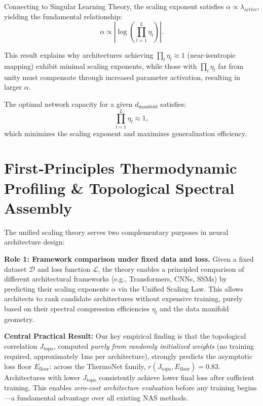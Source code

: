 \documentclass[11pt, a4paper]{article}
\theoremstyle{definition}
\begin{document}
Connecting to Singular Learning Theory, the scaling exponent satisfies $\alpha \propto \lambda_{\text{active}}$, yielding the fundamental relationship:
\begin{equation}
\alpha \propto \left| \log\left(\prod_{l=1}^{L} \eta_l\right) \right|.
\label{eq:alpha_log_eta}
\end{equation}

This result explains why architectures achieving $\prod_l \eta_l \approx 1$ (near-isentropic mapping) exhibit minimal scaling exponents, while those with $\prod_l \eta_l$ far from unity must compensate through increased parameter activation, resulting in larger $\alpha$.

\begin{coro}
The optimal network capacity for a given $d_{\text{manifold}}$ satisfies:
\begin{equation}
\prod_{l=1}^{L}\eta_l \approx 1,
\end{equation}
which minimizes the scaling exponent and maximizes generalization efficiency.
\end{coro}

\section{First‑Principles Thermodynamic Profiling \& Topological Spectral Assembly}
\label{sec:first-principles-tsa}

The unified scaling theory serves two complementary purposes in neural architecture design:

\textbf{Role 1: Framework comparison under fixed data and loss.} Given a fixed dataset $\mathcal{D}$ and loss function $\mathcal{L}$, the theory enables a principled comparison of different architectural frameworks (e.g., Transformers, CNNs, SSMs) by predicting their scaling exponents $\alpha$ via the Unified Scaling Law. This allows architects to rank candidate architectures without expensive training, purely based on their spectral compression efficiencies $\eta_l$ and the data manifold geometry.

\textbf{Central Practical Result:} Our key empirical finding is that the topological correlation $J_\mathrm{topo}$, computed \emph{purely from randomly initialized weights} (no training required, approximately 1ms per architecture), strongly predicts the asymptotic loss floor $E_\mathrm{floor}$: across the ThermoNet family, $r(J_\mathrm{topo}, E_\mathrm{floor}) = 0.83$. Architectures with lower $J_\mathrm{topo}$ consistently achieve lower final loss after sufficient training. This enables \emph{zero-cost architecture evaluation} before any training begins—a fundamental advantage over all existing NAS methods.
\end{document}
